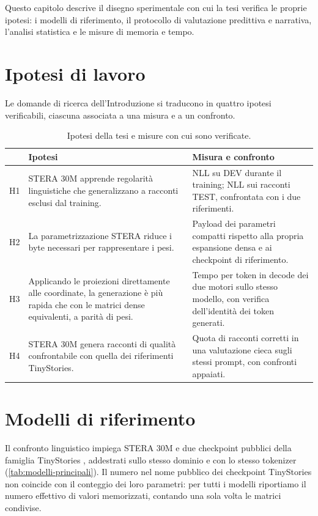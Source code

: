 Questo capitolo descrive il disegno sperimentale con cui la tesi verifica le proprie ipotesi: i modelli di riferimento, il protocollo di valutazione predittiva e narrativa, l'analisi statistica e le misure di memoria e tempo.

\section{Ipotesi di lavoro}
\label{sec:ipotesi}

Le domande di ricerca dell'Introduzione si traducono in quattro ipotesi verificabili, ciascuna associata a una misura e a un confronto.

\begin{table}[htbp]
\centering
\small
\begin{tabularx}{\linewidth}{lXX}
\toprule
& Ipotesi & Misura e confronto \\
\midrule
H1 & STERA 30M apprende regolarità linguistiche che generalizzano a racconti esclusi dal training. & NLL su DEV durante il training; NLL sui racconti TEST, confrontata con i due riferimenti. \\
H2 & La parametrizzazione STERA riduce i byte necessari per rappresentare i pesi. & Payload dei parametri compatti rispetto alla propria espansione densa e ai checkpoint di riferimento. \\
H3 & Applicando le proiezioni direttamente alle coordinate, la generazione è più rapida che con le matrici dense equivalenti, a parità di pesi. & Tempo per token in decode dei due motori sullo stesso modello, con verifica dell'identità dei token generati. \\
H4 & STERA 30M genera racconti di qualità confrontabile con quella dei riferimenti TinyStories. & Quota di racconti corretti in una valutazione cieca sugli stessi prompt, con confronti appaiati. \\
\bottomrule
\end{tabularx}
\caption{Ipotesi della tesi e misure con cui sono verificate.}
\label{tab:ipotesi}
\end{table}


\section{Modelli di riferimento}
\label{sec:metodo-modelli-tre}

Il confronto linguistico impiega STERA 30M e due checkpoint pubblici della famiglia TinyStories \cite{eldan2023tinystories}, addestrati sullo stesso dominio e con lo stesso tokenizer (\autoref{tab:modelli-principali}). Il numero nel nome pubblico dei checkpoint TinyStories non coincide con il conteggio dei loro parametri: per tutti i modelli riportiamo il numero effettivo di valori memorizzati, contando una sola volta le matrici condivise.

